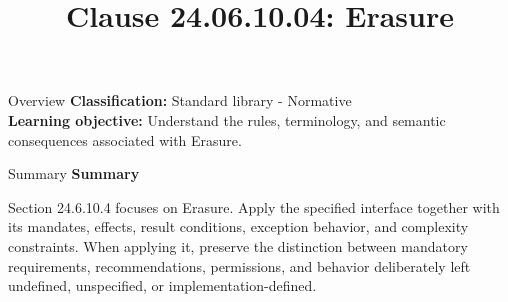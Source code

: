\documentclass[10pt,letterpaper]{article}
\title{Clause 24.06.10.04: Erasure}
\author{}
\date{}
\begin{document}
\maketitle
\begin{CornellOverviewBox}{Overview}
\textbf{Classification:} Standard library - Normative\\[2pt]
\textbf{Learning objective:} Understand the rules, terminology, and semantic consequences associated with Erasure.
\end{CornellOverviewBox}\begin{CornellSummaryBox}{Summary}
{\sffamily\bfseries\color{Accent} Summary}\par\vspace{3pt}Section 24.6.10.4 focuses on Erasure. Apply the specified interface together with its mandates, effects, result conditions, exception behavior, and complexity constraints. When applying it, preserve the distinction between mandatory requirements, recommendations, permissions, and behavior deliberately left undefined, unspecified, or implementation-defined.
\end{CornellSummaryBox}
\end{document}
